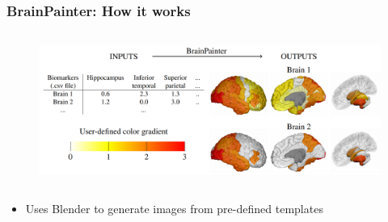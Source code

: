 \documentclass[10pt,xcolor=table,aspectratio=169]{beamer}
\begin{document}
\begin{frame}
 \frametitle{BrainPainter: How it works}

  
\begin{figure}
\centering
\includegraphics[height=5cm]{images/diagram.png}
\end{figure}
 
\begin{itemize}
 \item Uses Blender to generate images from pre-defined templates
\end{itemize}


 
\end{frame} 
\end{document}
